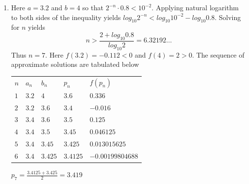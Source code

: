 \begin{myexercise}
\begin{mysolution}
\begin{enumerate}
\begin{enumerate}
\vspace{5mm}


\item [(c)] Here $a=3.2$ and $b=4$ so that $2^{-n}\cdot0.8<10^{-2}$. Applying natural logarithm to both sides of the inequality yields $log_{10}2^{-n}<log_{10}10^{-2}-log_{10}0.8$. Solving for $n$ yields 
\[n>\frac{2+log_{10}0.8}{log_{10}2}=6.32192\ldots\]
Thus $n=7$. Here $f(3.2)=-0.112<0$ and $f(4)=2>0$. The sequence of approximate solutions are tabulated below
\begin{center}
\begin{tabular}{lllll}\hline
$n$&$a_n$&$b_n$&$p_n$&$f(p_n)$\\
$1$&$3.2$&$4$&$3.6$&$0.336$\\
$2$&$3.2$&$3.6$&$3.4$&$-0.016$\\
$3$&$3.4$&$3.6$&$3.5$&$0.125$\\
$4$&$3.4$&$3.5$&$3.45$&$0.046125$\\
$5$&$3.4$&$3.45$&$3.425$&$0.013015625$\\
$6$&$3.4$&$3.425$&$3.4125$&$-0.00199804688$\\\hline
\end{tabular}
\end{center}

\vspace{3mm}
$p_7=\frac{3.4125+3.425}{2}=3.419$
\end{enumerate}
\end{enumerate}
\end{mysolution}
\end{myexercise}
 

